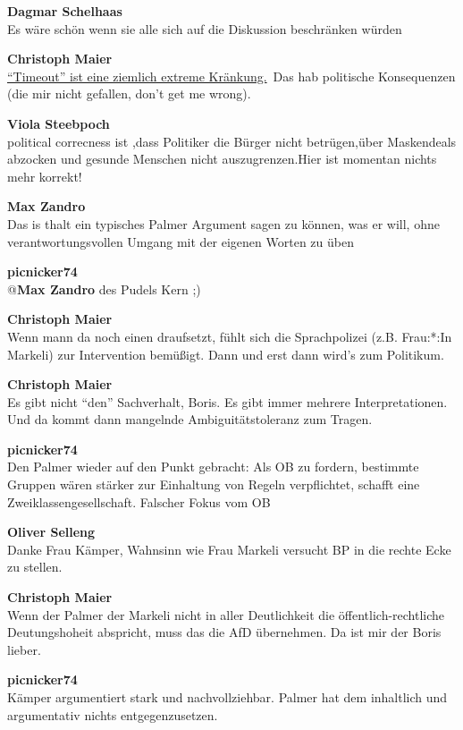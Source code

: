 \documentclass[a4,parindent=0pt]{article}
\begin{document}
\textbf{Dagmar Schelhaas}\\
Es wäre schön wenn sie alle sich auf die Diskussion beschränken würden

\textbf{Christoph Maier}\\
\hyperref[timeout]{``Timeout'' ist eine ziemlich extreme
Kränkung.}\
Das hab politische Konsequenzen (die mir nicht gefallen,
don't get me wrong).

\textbf{Viola Steebpoch}\\
political correcness ist ,dass Politiker die Bürger nicht betrügen,über
Maskendeals abzocken und gesunde Menschen nicht auszugrenzen.Hier ist
momentan nichts mehr korrekt!

\textbf{Max Zandro}\\
Das is thalt ein typisches Palmer Argument sagen zu können, was er
will, ohne verantwortungsvollen Umgang mit der eigenen Worten zu üben

\textbf{picnicker74}\\
@\textbf{Max Zandro} des Pudels Kern ;)

\textbf{Christoph Maier}\\
Wenn mann da noch einen draufsetzt, fühlt sich die Sprachpolizei (z.B.
Frau:*:In Markeli) zur Intervention bemüßigt. Dann und erst dann wird's
zum Politikum.

\textbf{Christoph Maier}\\
Es gibt nicht ``den'' Sachverhalt, Boris.
Es gibt immer mehrere
Interpretationen.\cite{calliope}
Und da kommt dann mangelnde
Ambiguitätstoleranz\cite{ambiguitaetstoleranz} zum
Tragen.

\textbf{picnicker74}\\
Den Palmer wieder auf den Punkt gebracht: Als OB zu fordern, bestimmte
Gruppen wären stärker zur Einhaltung von Regeln verpflichtet, schafft
eine Zweiklassengesellschaft. Falscher Fokus vom OB

\textbf{Oliver Selleng}\\
Danke Frau Kämper, Wahnsinn wie Frau Markeli versucht BP in die rechte
Ecke zu stellen.

\textbf{Christoph Maier}\\
Wenn der Palmer der Markeli nicht in aller Deutlichkeit die
öffentlich-rechtliche Deutungshoheit\cite{deutungshoheit}
abspricht, muss das die AfD übernehmen. Da ist mir der Boris lieber.

\textbf{picnicker74}\\
Kämper argumentiert stark und nachvollziehbar. Palmer hat dem
inhaltlich und argumentativ nichts entgegenzusetzen.
\end{document}
